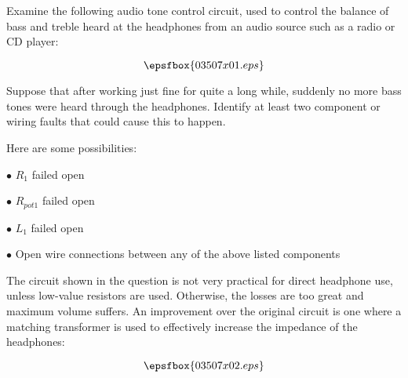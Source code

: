 

Examine the following audio tone control circuit, used to control the balance of bass and treble heard at the headphones from an audio source such as a radio or CD player:

$$\epsfbox{03507x01.eps}$$

Suppose that after working just fine for quite a long while, suddenly no more bass tones were heard through the headphones.  Identify at least two component or wiring faults that could cause this to happen.







Here are some possibilities:

\medskip
\item{$\bullet$} $R_1$ failed open
\item{$\bullet$} $R_{pot1}$ failed open
\item{$\bullet$} $L_1$ failed open
\item{$\bullet$} Open wire connections between any of the above listed components
\medskip







The circuit shown in the question is not very practical for direct headphone use, unless low-value resistors are used.  Otherwise, the losses are too great and maximum volume suffers.  An improvement over the original circuit is one where a matching transformer is used to effectively increase the impedance of the headphones:

$$\epsfbox{03507x02.eps}$$




